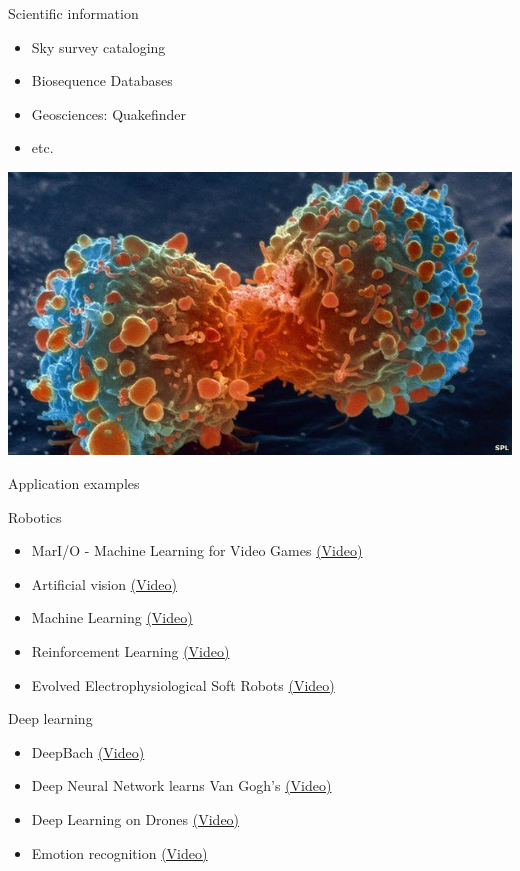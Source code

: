 \documentclass{beamer}
\begin{document}
\begin{frame}{Scientific information}

\begin{itemize}
 \item Sky survey cataloging
 \item Biosequence Databases
 \item Geosciences: Quakefinder
 \item etc.
\end{itemize}

\begin{center}
\includegraphics[width=.3\textwidth]{figs/bioinformatics}
\end{center}

\end{frame}

\begin{frame}{Application examples}

Robotics
\begin{itemize}
    \item MarI/O - Machine Learning for Video Games \href{https://www.youtube.com/watch?v=qv6UVOQ0F44}{(Video)}
    \item Artificial vision \href{https://www.youtube.com/watch?v=4KlYdCBdjEg}{(Video)}
    \item Machine Learning \href{https://www.youtube.com/watch?v=pgaEE27nsQw}{(Video)}
    \item Reinforcement Learning \href{https://www.youtube.com/watch?v=W\_gxLKSsSIE}{(Video)}
    \item Evolved Electrophysiological Soft Robots \href{https://www.youtube.com/watch?v=HgWQ-gPIvt4}{(Video)}
\end{itemize}

Deep learning
\begin{itemize}
    \item DeepBach \href{https://www.youtube.com/watch?v=QiBM7-5hA6o}{(Video)}
    \item Deep Neural Network learns Van Gogh's \href{https://www.youtube.com/watch?v=-R9bJGNHltQ}{(Video)}
    \item Deep Learning on Drones \href{https://www.youtube.com/watch?v=wSFYOw4VIYY}{(Video)}
    \item Emotion recognition \href{https://www.youtube.com/watch?v=PL3xJErjEgU}{(Video)}
\end{itemize}


\end{frame}
\end{document}
